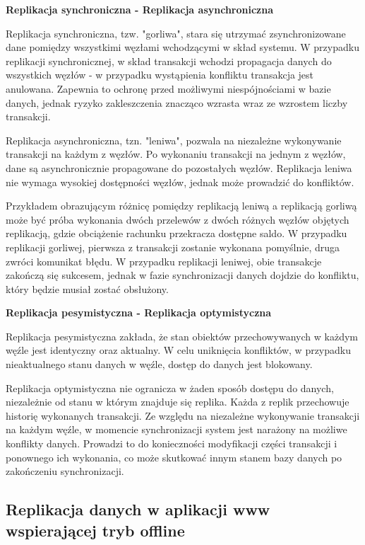 \setlength{\parskip}{10pt plus 1pt minus 1pt}
\textbf{Replikacja synchroniczna - Replikacja asynchroniczna}
\setlength{\parskip}{10pt plus 1pt minus 1pt}

Replikacja synchroniczna, tzw. "gorliwa", stara się utrzymać zsynchronizowane dane pomiędzy wszystkimi węzłami wchodzącymi w skład systemu. W przypadku replikacji synchronicznej, w skład transakcji wchodzi propagacja danych do wszystkich węzłów - w przypadku wystąpienia konfliktu transakcja jest anulowana. Zapewnia to ochronę przed możliwymi niespójnościami w bazie danych, jednak ryzyko zakleszczenia znacząco wzrasta wraz ze wzrostem liczby transakcji.

Replikacja asynchroniczna, tzn. "leniwa", pozwala na niezależne wykonywanie transakcji na każdym z węzłów. Po wykonaniu transakcji na jednym z węzłów, dane są asynchronicznie propagowane do pozostałych węzłów. Replikacja leniwa nie wymaga wysokiej dostępności węzłów, jednak może prowadzić do konfliktów.

Przykładem obrazującym różnicę pomiędzy replikacją leniwą a replikacją gorliwą może być próba wykonania dwóch przelewów z dwóch różnych węzłów objętych replikacją, gdzie obciążenie rachunku przekracza dostępne saldo. W przypadku replikacji gorliwej, pierwsza z transakcji zostanie wykonana pomyślnie, druga zwróci komunikat błędu. W przypadku replikacji leniwej, obie transakcje zakończą się sukcesem, jednak w fazie synchronizacji danych dojdzie do konfliktu, który będzie musiał zostać obsłużony.

\setlength{\parskip}{10pt plus 1pt minus 1pt}
\textbf{Replikacja pesymistyczna - Replikacja optymistyczna}
\setlength{\parskip}{10pt plus 1pt minus 1pt}

Replikacja pesymistyczna zakłada, że stan obiektów przechowywanych w każdym węźle jest identyczny oraz aktualny. W celu uniknięcia konfliktów, w przypadku nieaktualnego stanu danych w węźle, dostęp do danych jest blokowany.

Replikacja optymistyczna nie ogranicza w żaden sposób dostępu do danych, niezależnie od stanu w którym znajduje się replika. Każda z replik przechowuje historię wykonanych transakcji. Ze względu na niezależne wykonywanie transakcji na każdym węźle, w momencie synchronizacji system jest narażony na możliwe konflikty danych. Prowadzi to do konieczności modyfikacji części transakcji i ponownego ich wykonania, co może skutkować innym stanem bazy danych po zakończeniu synchronizacji.

\subsection{Replikacja danych w aplikacji www wspierającej tryb offline}
\label{sec:replDanWAplWWWWspTrybOffline}

